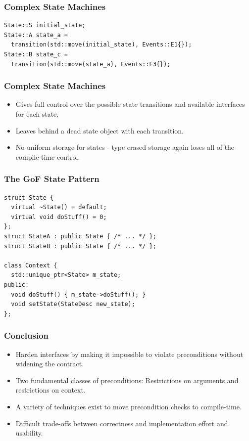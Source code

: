 \documentclass[aspectratio=169]{beamer}
\begin{document}
\begin{frame}[fragile]
  \frametitle{Complex State Machines}
  
  \begin{lstlisting}[style=cpp20]
State::S initial_state;
State::A state_a =
  transition(std::move(initial_state), Events::E1{});
State::B state_c =
  transition(std::move(state_a), Events::E3{});
  \end{lstlisting}
\end{frame}

\begin{frame}[fragile]
  \frametitle{Complex State Machines}
  
  \begin{itemize}
  \item Gives full control over the possible state transitions and available interfaces for each state.
  \item Leaves behind a dead state object with each transition.
  \item No uniform storage for states - type erased storage again loses all of the compile-time control.
  \end{itemize}
\end{frame}

\begin{frame}[fragile]
  \frametitle{The GoF State Pattern}
  
  \begin{lstlisting}[style=cpp20]
struct State {
  virtual ~State() = default;
  virtual void doStuff() = 0;
};
struct StateA : public State { /* ... */ };
struct StateB : public State { /* ... */ };

class Context {
  std::unique_ptr<State> m_state;
public:
  void doStuff() { m_state->doStuff(); }
  void setState(StateDesc new_state);
};
  \end{lstlisting}
\end{frame}

%

\begin{frame}
  \frametitle{Conclusion}
  
  \begin{itemize}
  \item Harden interfaces by making it impossible to violate preconditions without widening the contract.
  \item Two fundamental classes of preconditions: Restrictions on arguments and restrictions on context.
  \item A variety of techniques exist to move precondition checks to compile-time.
  \item Difficult trade-offs between correctness and implementation effort and usability.
  \end{itemize}
\end{frame}
\end{document}
